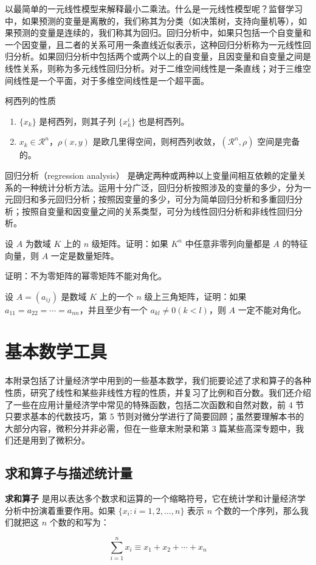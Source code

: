 \documentclass[lang=cn,newtx,10pt,scheme=chinese]{elegantbook}
\begin{document}
以最简单的一元线性模型来解释最小二乘法。什么是一元线性模型呢？监督学习中，如果预测的变量是离散的，我们称其为分类（如决策树，支持向量机等），如果预测的变量是连续的，我们称其为回归。回归分析中，如果只包括一个自变量和一个因变量，且二者的关系可用一条直线近似表示，这种回归分析称为一元线性回归分析。如果回归分析中包括两个或两个以上的自变量，且因变量和自变量之间是线性关系，则称为多元线性回归分析。对于二维空间线性是一条直线；对于三维空间线性是一个平面，对于多维空间线性是一个超平面。

\begin{property}\label{property:cauchy}
柯西列的性质
\begin{enumerate}
\item $\{x_k\}$ 是柯西列，则其子列 $\{x_k^i\}$ 也是柯西列。
\item $x_k\in \mathcal{R}^n$，$\rho(x,y)$ 是欧几里得空间，则柯西列收敛，$(\mathcal{R}^n,\rho)$ 空间是完备的。
\end{enumerate}
\end{property}

\begin{conclusion}
回归分析（regression analysis） 是确定两种或两种以上变量间相互依赖的定量关系的一种统计分析方法。运用十分广泛，回归分析按照涉及的变量的多少，分为一元回归和多元回归分析；按照因变量的多少，可分为简单回归分析和多重回归分析；按照自变量和因变量之间的关系类型，可分为线性回归分析和非线性回归分析。
\end{conclusion}

\begin{problemset}
\item 设 $A$ 为数域 $K$ 上的 $n$ 级矩阵。证明：如果 $K^n$ 中任意非零列向量都是 $A$ 的特征向量，则 $A$ 一定是数量矩阵。
\item 证明：不为零矩阵的幂零矩阵不能对角化。
\item 设 $A = (a_{ij})$ 是数域 $K$ 上的一个 $n$ 级上三角矩阵，证明：如果 $a_{11} = a_{22} = \cdots = a_{nn}$，并且至少有一个 $a_{kl} \not = 0 (k < l)$，则 $A$ 一定不能对角化。
\end{problemset}


\nocite{*}
\printbibliography[heading=bibintoc, title=\ebibname]
\appendix

\chapter{基本数学工具}


本附录包括了计量经济学中用到的一些基本数学，我们扼要论述了求和算子的各种性质，研究了线性和某些非线性方程的性质，并复习了比例和百分数。我们还介绍了一些在应用计量经济学中常见的特殊函数，包括二次函数和自然对数，前 4 节只要求基本的代数技巧，第 5 节则对微分学进行了简要回顾；虽然要理解本书的大部分内容，微积分并非必需，但在一些章末附录和第 3 篇某些高深专题中，我们还是用到了微积分。

\section{求和算子与描述统计量}

\textbf{求和算子} 是用以表达多个数求和运算的一个缩略符号，它在统计学和计量经济学分析中扮演着重要作用。如果 $\{x_i: i=1, 2, \ldots, n\}$ 表示 $n$ 个数的一个序列，那么我们就把这 $n$ 个数的和写为：

\begin{equation}
\sum_{i=1}^n x_i \equiv x_1 + x_2 +\cdots + x_n
\end{equation}
\end{document}
